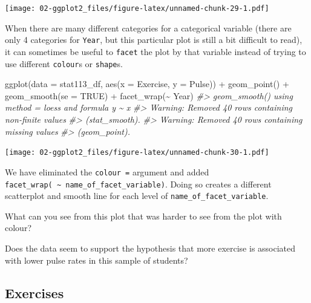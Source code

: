 \documentclass[
]{book}
\newenvironment{Shaded}{\begin{snugshade}}{\end{snugshade}}
\newcommand{\AttributeTok}[1]{\textcolor[rgb]{0.77,0.63,0.00}{#1}}
\newcommand{\CommentTok}[1]{\textcolor[rgb]{0.56,0.35,0.01}{\textit{#1}}}
\newcommand{\ConstantTok}[1]{\textcolor[rgb]{0.00,0.00,0.00}{#1}}
\newcommand{\FunctionTok}[1]{\textcolor[rgb]{0.00,0.00,0.00}{#1}}
\newcommand{\NormalTok}[1]{#1}
\newcommand{\SpecialCharTok}[1]{\textcolor[rgb]{0.00,0.00,0.00}{#1}}
\begin{document}
\texttt{[image: 02-ggplot2\_files/figure-latex/unnamed-chunk-29-1.pdf]}

When there are many different categories for a categorical variable (there are only 4 categories for \texttt{Year}, but this particular plot is still a bit difficult to read), it can sometimes be useful to \texttt{facet} the plot by that variable instead of trying to use different \texttt{colour}s or \texttt{shape}s.

\begin{Shaded}
\begin{Highlighting}[]
\FunctionTok{ggplot}\NormalTok{(}\AttributeTok{data =}\NormalTok{ stat113\_df, }\FunctionTok{aes}\NormalTok{(}\AttributeTok{x =}\NormalTok{ Exercise, }\AttributeTok{y =}\NormalTok{ Pulse)) }\SpecialCharTok{+}
  \FunctionTok{geom\_point}\NormalTok{() }\SpecialCharTok{+}
  \FunctionTok{geom\_smooth}\NormalTok{(}\AttributeTok{se =} \ConstantTok{TRUE}\NormalTok{) }\SpecialCharTok{+}
  \FunctionTok{facet\_wrap}\NormalTok{(}\SpecialCharTok{\textasciitilde{}}\NormalTok{ Year)}
\CommentTok{\#\textgreater{} \textasciigrave{}geom\_smooth()\textasciigrave{} using method = \textquotesingle{}loess\textquotesingle{} and formula \textquotesingle{}y \textasciitilde{} x\textquotesingle{}}
\CommentTok{\#\textgreater{} Warning: Removed 40 rows containing non{-}finite values}
\CommentTok{\#\textgreater{} (stat\_smooth).}
\CommentTok{\#\textgreater{} Warning: Removed 40 rows containing missing values}
\CommentTok{\#\textgreater{} (geom\_point).}
\end{Highlighting}
\end{Shaded}

\texttt{[image: 02-ggplot2\_files/figure-latex/unnamed-chunk-30-1.pdf]}

We have eliminated the \texttt{colour\ =} argument and added \texttt{facet\_wrap(\ \textasciitilde{}\ name\_of\_facet\_variable)}. Doing so creates a different scatterplot and smooth line for each level of \texttt{name\_of\_facet\_variable}.

What can you see from this plot that was harder to see from the plot with colour?

Does the data seem to support the hypothesis that more exercise is associated with lower pulse rates in this sample of students?

\hypertarget{exercise-2-2}{%
\subsection{Exercises}\label{exercise-2-2}}
\end{document}
